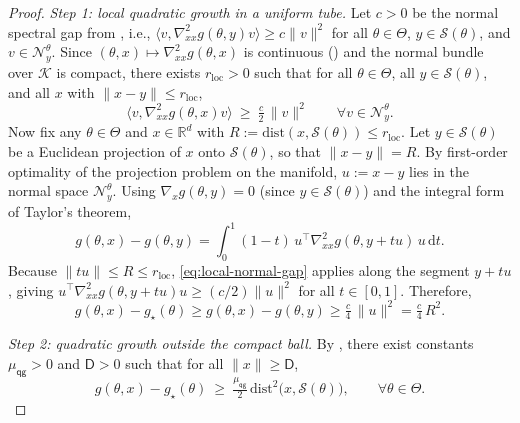 \documentclass{article}
\theoremstyle{normaltheorem}
\newcommand{\ud}{\mathrm{d}}
\newcommand{\R}{\mathbb{R}}
\newcommand{\calS}{\mathcal{S}}
\newcommand{\calN}{\mathcal{N}}
\begin{document}
\begin{proof}
\emph{Step 1: local quadratic growth in a uniform tube.}
Let $c>0$ be the normal spectral gap from , i.e.,
$\langle v,\nabla_{xx}^2 g(\theta,y)v\rangle\ge c\|v\|^2$ for all $\theta\in\Theta$, $y\in\calS(\theta)$, and
$v\in\calN_y^\theta$.
Since $(\theta,x)\mapsto \nabla^2_{xx}g(\theta,x)$ is continuous () and the normal bundle over
\(\mathcal K\) is compact, there exists $r_{\mathrm{loc}}>0$ such that
for all $\theta\in\Theta$, all $y\in\calS(\theta)$, and all $x$ with $\|x-y\|\le r_{\mathrm{loc}}$,
\begin{equation}\label{eq:local-normal-gap}
\langle v,\nabla_{xx}^2 g(\theta,x)v\rangle\ \ge\ \tfrac{c}{2}\,\|v\|^2
\qquad \forall v\in\calN_y^\theta.
\end{equation}
Now fix any $\theta\in\Theta$ and $x\in\R^d$ with $R:=\mathrm{dist}(x,\calS(\theta))\le r_{\mathrm{loc}}$.
Let $y\in\calS(\theta)$ be a Euclidean projection of $x$ onto $\calS(\theta)$, so that $\|x-y\|=R$.
By first-order optimality of the projection problem on the manifold, $u:=x-y$ lies in the normal space $\calN_y^\theta$.
Using $\nabla_x g(\theta,y)=0$ (since $y\in\calS(\theta)$) and the integral form of Taylor's theorem,
\[
g(\theta,x)-g(\theta,y)
=\int_0^1 (1-t)\,u^\top \nabla_{xx}^2 g(\theta,y+t u)\,u\,\ud t.
\]
Because $\|t u\|\le R\le r_{\mathrm{loc}}$, \eqref{eq:local-normal-gap} applies along the segment $y+t u$, giving
$u^\top \nabla^2_{xx} g(\theta,y+t u)u\ge (c/2)\|u\|^2$ for all $t\in[0,1]$.
Therefore,
\begin{equation}\label{eq:qg-local}
g(\theta,x)-g_\star(\theta)
\ge
g(\theta,x)-g(\theta,y)
\ge
\tfrac{c}{4}\,\|u\|^2
=\tfrac{c}{4}\,R^2.
\end{equation}

\emph{Step 2: quadratic growth outside the compact ball.}
By , there exist constants $\mu_{\mathsf{qg}}>0$ and $\mathsf D>0$ such that for all $\|x\|\ge \mathsf D$,
\begin{equation}\label{eq:qg-outside}
g(\theta,x)-g_\star(\theta)\ \ge\ \tfrac{\mu_{\mathsf{qg}}}{2}\, \mathrm{dist}^2\!\bigl(x,\calS(\theta)\bigr),
\qquad \forall \theta\in\Theta.
\end{equation}


\end{proof}
\end{document}
